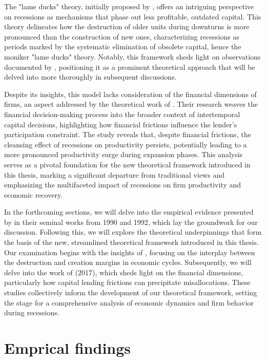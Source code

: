 \documentclass[12pt]{article}
\begin{document}
The "lame ducks" theory, initially proposed by \cite{CabHarm94}, offers an intriguing perspective on
recessions as mechanisms that phase out less profitable, outdated capital. This theory delineates how the destruction of
older units during downturns is more pronounced than the construction of new ones, characterizing recessions as periods
marked by the systematic elimination of obsolete capital, hence the moniker "lame ducks" theory. Notably, this framework
sheds light on observations documented by \cite{DavHalt92}, positioning it as a prominent theoretical
approach that will be delved into more thoroughly in subsequent discussions. 

Despite its insights, this model lacks consideration of the financial dimensions of firms, an aspect addressed by the
theoretical work of \cite{OsePap17}. Their research weaves the financial decision-making process into the
broader context of intertemporal capital decisions, highlighting how financial frictions influence the lender's
participation constraint. The study reveals that, despite financial frictions, the cleansing effect of recessions on
productivity persists, potentially leading to a more pronounced productivity surge during expansion phases. This
analysis serves as a pivotal foundation for the new theoretical framework introduced in this thesis, marking a
significant departure from traditional views and emphasizing the multifaceted impact of recessions on firm productivity
and economic recovery. 

In the forthcoming sections, we will delve into the empirical evidence presented by \cite{DavHalt92} in their
seminal works from 1990 and 1992, which lay the groundwork for our discussion. Following this, we will explore the
theoretical underpinnings that form the basis of the new, streamlined theoretical framework introduced in this thesis.
Our examination begins with the insights of \cite{CabHarm94}, focusing on the interplay between the
destruction and creation margins in economic cycles. Subsequently, we will delve into the work of \cite{OsePap17}
(2017), which sheds light on the financial dimensions, particularly how capital lending frictions can precipitate
misallocations. These studies collectively inform the development of our theoretical framework, setting the stage for a
comprehensive analysis of economic dynamics and firm behavior during recessions. 

\section{Emprical findings}
\end{document}
